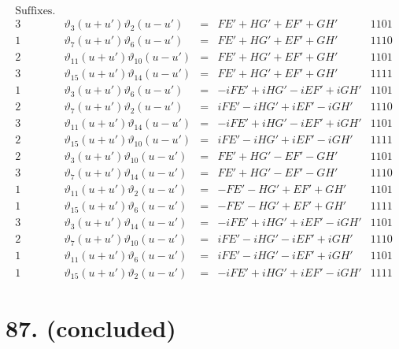 \documentclass[11pt,a4paper]{article}
\newcommand{\uth}[1]{\vartheta_{#1}}
\begin{document}
\[
\begin{array}{ccccc}
\text{Suffixes.} & & & & \\
\hline
3 & \uth{3}(u+u')\uth{2}(u-u') &=& FE' + HG' + EF' + GH' & 1101 \\
1 & \uth{7}(u+u')\uth{6}(u-u') &=& FE' + HG' + EF' + GH' & 1110 \\
2 & \uth{11}(u+u')\uth{10}(u-u') &=& FE' + HG' + EF' + GH' & 1101 \\
3 & \uth{15}(u+u')\uth{14}(u-u') &=& FE' + HG' + EF' + GH' & 1111 \\
\hline
1 & \uth{3}(u+u')\uth{6}(u-u') &=& -iFE' + iHG' - iEF' + iGH' & 1101 \\
2 & \uth{7}(u+u')\uth{2}(u-u') &=& iFE' - iHG' + iEF' - iGH' & 1110 \\
3 & \uth{11}(u+u')\uth{14}(u-u') &=& -iFE' + iHG' - iEF' + iGH' & 1101 \\
2 & \uth{15}(u+u')\uth{10}(u-u') &=& iFE' - iHG' + iEF' - iGH' & 1111 \\
\hline
2 & \uth{3}(u+u')\uth{10}(u-u') &=& FE' + HG' - EF' - GH' & 1101 \\
3 & \uth{7}(u+u')\uth{14}(u-u') &=& FE' + HG' - EF' - GH' & 1110 \\
1 & \uth{11}(u+u')\uth{2}(u-u') &=& -FE' - HG' + EF' + GH' & 1101 \\
1 & \uth{15}(u+u')\uth{6}(u-u') &=& -FE' - HG' + EF' + GH' & 1111 \\
\hline
3 & \uth{3}(u+u')\uth{14}(u-u') &=& -iFE' + iHG' + iEF' - iGH' & 1101 \\
2 & \uth{7}(u+u')\uth{10}(u-u') &=& iFE' - iHG' - iEF' + iGH' & 1110 \\
1 & \uth{11}(u+u')\uth{6}(u-u') &=& iFE' - iHG' - iEF' + iGH' & 1101 \\
1 & \uth{15}(u+u')\uth{2}(u-u') &=& -iFE' + iHG' + iEF' - iGH' & 1111
\end{array}
\]

\newpage
\section*{87. (concluded)}
\label{sec:87conc}
\end{document}
